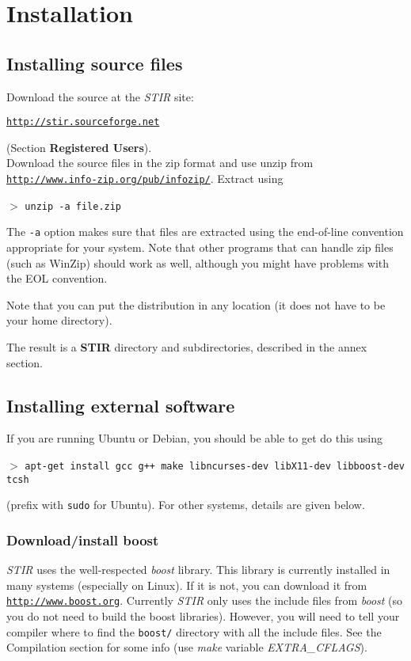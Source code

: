 \documentclass{article}
\def\R2Lurl#1#2{\mbox{\href{#1}{\tt #2}}}
\newcommand{\cmdline}[1]{\par \noindent $>$ \texttt{#1}\par}
\begin{document}
\section{
Installation}

\subsection{
Installing source files}

Download the source at the \textit{STIR} site: 
\begin{center}
\R2Lurl{http://stir.sourceforge.net }{http://stir.sourceforge.net} 
\end{center}
\noindent (Section \textbf{Registered Users}).\\
Download the source files in the zip format and use unzip from \\
\R2Lurl{http://www.info-zip.org/pub/infozip/}{http://www.info-zip.org/pub/infozip/}. 
Extract using
\cmdline{unzip -a file.zip}


The \texttt{-a} option makes sure that files are extracted using the 
end-of-line convention appropriate for your system. Note that 
other programs that can handle zip files (such as WinZip) should 
work as well, although you might have problems with the EOL convention.


Note that you can put the distribution in any location (it does 
not have to be your home directory).


The result is a \textbf{STIR} directory and subdirectories, described 
in the annex section.

\subsection{
Installing external software}
If you are running Ubuntu or Debian, you should be able to get do this using

\cmdline{apt-get install  gcc g++ make libncurses-dev libX11-dev libboost-dev tcsh}

(prefix with \texttt{sudo} for Ubuntu). For other systems, details are given below.

\subsubsection{Download/install boost}
\textit{STIR} uses the well-respected \textit{boost} library. This library
is currently installed in many systems (especially on Linux). If it
is not, you can download it from 
\R2Lurl{http://www.boost.org}{http://www.boost.org}. Currently \textit{STIR} only
uses the include files from \textit{boost} (so you do not need to build
the boost libraries). However, you will need to tell your compiler
where to find the \texttt{boost/} directory with all the include files.
See the Compilation section for some info (use \textit{make} variable 
\textit{EXTRA\_CFLAGS}).
\end{document}
